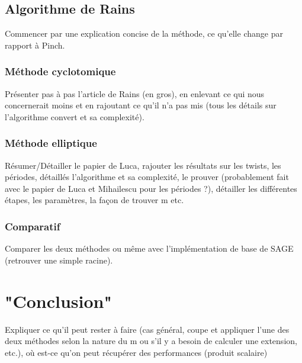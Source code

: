\documentclass[a4paper]{article} %
\numberwithin{equation}{section}
\begin{document}
\subsection{Algorithme de Rains}
Commencer par une explication concise de la méthode, ce qu'elle change par rapport à Pinch.
\subsubsection{Méthode cyclotomique}
Présenter pas à pas l'article de Rains (en gros), en enlevant ce qui nous concernerait moins et en rajoutant ce qu'il n'a pas mis (tous les détails sur l'algorithme convert et sa complexité).
\subsubsection{Méthode elliptique}
Résumer/Détailler le papier de Luca, rajouter les résultats sur les twists, les périodes, détaillés l'algorithme et sa complexité, le prouver (probablement fait avec le papier de Luca et Mihailescu pour les périodes ?), détailler les différentes étapes, les paramètres, la façon de trouver m etc.
\subsubsection{Comparatif}
Comparer les deux méthodes ou même avec l'implémentation de base de SAGE (retrouver une simple racine).
\section{"Conclusion"}
Expliquer ce qu'il peut rester à faire (cas général, coupe et appliquer l'une des deux méthodes selon la nature du m ou s'il y a besoin de calculer une extension, etc.), où est-ce qu'on peut récupérer des performances (produit scalaire)
\end{document}
